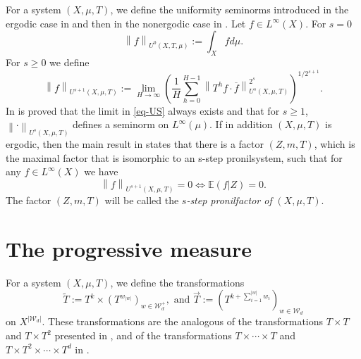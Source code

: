 \documentclass[letter,11pt]{article}
\theoremstyle{definition}
\newcommand{\E}{\mathbb{E}}
\newcommand{\norm}[1]{\left\lVert#1\right\rVert}
\begin{document}
For a system $(X,\mu,T)$, we define the uniformity seminorms introduced in the ergodic case in \cite{Host_Kra_nonconventional_averages_nilmanifolds:2005} and then in the nonergodic case in \cite{CFH11}. Let $f\in L^\infty(X)$. For $s=0$
$$\norm{f}_{U^0(X,T,\mu)}:=\int_X f d\mu.$$
For $s\geq 0$ we define 
\begin{equation}\label{eq-US}
   \norm{f}_{U^{s+1}(X,\mu,T)}:=\lim_{H\to \infty} \left( \frac{1}{H}\sum_{h=0}^{H-1} \norm{T^h f \cdot \overline{f}}_{U^{s}(X,\mu,T)}^{2^s} \right)^{1/2^{s+1}}. 
\end{equation}
In \cite{Host_Kra_nonconventional_averages_nilmanifolds:2005} is proved that the limit in \cref{eq-US} always exists and that for $s\geq 1$, $\norm{\cdot}_{U^s(X,\mu,T)}$ defines a seminorm on $L^\infty(\mu)$. If in addition $(X,\mu,T)$ is ergodic, then the main result in \cite{Host_Kra_nonconventional_averages_nilmanifolds:2005} states that there is a factor $(Z,m,T)$, which is the maximal factor that is isomorphic to an s-step pronilsystem, such that for any $f\in L^\infty(X)$ we have 
$$\norm{f}_{U^{s+1}(X,\mu,T)}=0 \iff \E(f |Z)=0. $$
The factor $(Z,m,T)$ will be called the \textit{$s$-step pronilfactor of} $(X,\mu,T)$.



\section{The progressive measure}\label{sec3}

For a system $(X,\mu,T)$, we define the transformations
\begin{equation*}
    \tilde{T}:=  T^k \times(T^{w_{|w|}})_{w\in \mathcal{W}_d^{+}} ,\text{ and } \Vec{T}:= (T^{k+\sum_{i=1}^{|w|}w_i})_{w\in \mathcal{W}_d}
\end{equation*}
on $X^{|\mathcal{W}_d|}$. These transformations are the analogous of the transformations $T\times T$ and $T\times T^2$ presented in \cite{Kra_Moreira_Richter_Robertson:2023}, and of the transformations $T\times\cdots\times T$ and $T\times T^2\times\cdots\times T^d$ in \cite{kmrr25}. 
\end{document}
